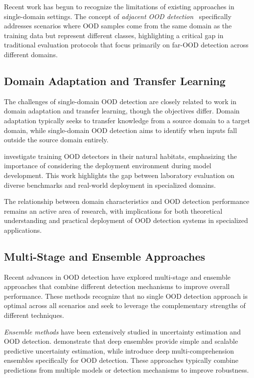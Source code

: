 \documentclass[11pt, oneside]{book}
\theoremstyle{plain}
\theoremstyle{definition}
\theoremstyle{remark}
\begin{document}
Recent work has begun to recognize the limitations of existing approaches in single-domain settings. The concept of \emph{adjacent OOD detection}~\citep{yangcan} specifically addresses scenarios where OOD samples come from the same domain as the training data but represent different classes, highlighting a critical gap in traditional evaluation protocols that focus primarily on far-OOD detection across different domains.

\subsection{Domain Adaptation and Transfer Learning}

The challenges of single-domain OOD detection are closely related to work in domain adaptation and transfer learning, though the objectives differ. Domain adaptation typically seeks to transfer knowledge from a source domain to a target domain, while single-domain OOD detection aims to identify when inputs fall outside the source domain entirely.

\citet{katz2022training} investigate training OOD detectors in their natural habitats, emphasizing the importance of considering the deployment environment during model development. This work highlights the gap between laboratory evaluation on diverse benchmarks and real-world deployment in specialized domains.

The relationship between domain characteristics and OOD detection performance remains an active area of research, with implications for both theoretical understanding and practical deployment of OOD detection systems in specialized applications.

\subsection{Multi-Stage and Ensemble Approaches}

Recent advances in OOD detection have explored multi-stage and ensemble approaches that combine different detection mechanisms to improve overall performance. These methods recognize that no single OOD detection approach is optimal across all scenarios and seek to leverage the complementary strengths of different techniques.

\emph{Ensemble methods} have been extensively studied in uncertainty estimation and OOD detection. \citet{lakshminarayanan2017simple} demonstrate that deep ensembles provide simple and scalable predictive uncertainty estimation, while \citet{pmlr-v235-xu24ae} introduce deep multi-comprehension ensembles specifically for OOD detection. These approaches typically combine predictions from multiple models or detection mechanisms to improve robustness.
\end{document}
